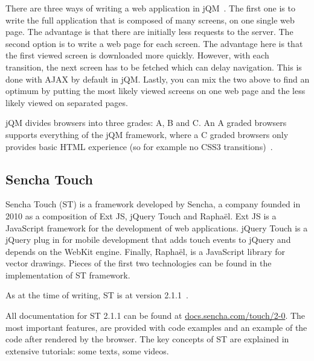 \documentclass[a4paper]{artikel3}
\renewcommand{\url}[1]{\href{http://#1}{#1}}
\newcommand{\setspace}[0]{\vspace{2mm}}
\renewcommand{\paragraph}[1]{\setspace \noindent {\bf #1}  }
\begin{document}
There are three ways of writing a web application in jQM~\cite{Broulik2012}. 
The first one is to write the full application that is composed of many screens, on one single web page.
The advantage is that there are initially less requests to the server.
The second option is to write a web page for each screen. 
The advantage here is that the first viewed screen is downloaded more quickly. 
However, with each transition, the next screen has to be fetched which can delay navigation.
This is done with AJAX by default in jQM.
Lastly, you can mix the two above to find an optimum by putting the most likely viewed screens on one web page and the less likely viewed on separated pages.  

\paragraph{Browser support}
\label{sec:jqm-browser-support}
jQM divides browsers into three grades: A, B and C. 
An A graded browsers supports everything of the jQM framework, where a C graded browsers only provides basic HTML experience (so for example no CSS3 transitions)~\cite{JQuery2012d}.

\subsection{Sencha Touch} %
\label{sec:sencha_touch}

Sencha Touch (ST) is a framework developed by Sencha,  a company founded in 2010 as a composition of Ext JS, jQuery Touch and Raphaël.  
Ext JS is a JavaScript framework for the development of web applications.  
jQuery Touch is a jQuery plug in for mobile development that adds touch events to jQuery and depends on the WebKit engine.  
Finally,  Raphaël, is a JavaScript library for vector drawings.  
Pieces of the first two technologies can be found in the implementation of ST framework.    

As at the time of writing,  ST is at version 2.1.1~\cite{Inc.}.

\paragraph{Documentation}
All documentation for ST 2.1.1 can be found at \url{docs.sencha.com/touch/2-0}.  
The most important features,  are provided with code examples and an example of the code after rendered by the browser.  
The key concepts of ST are explained in extensive tutorials:  some texts, some videos.  
\end{document}

